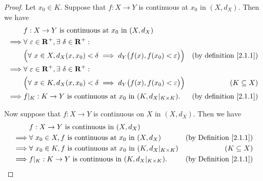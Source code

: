 \begin{proof}
    Let \(x_0 \in K\).
    Suppose that \(f : X \to Y\) is continuous at \(x_0\) in \((X, d_X)\).
    Then we have
    \begin{align*}
                 & f : X \to Y \text{ is continuous at } x_0 \text{ in } (X, d_X)                                                                         \\
        \implies & \forall\ \varepsilon \in \mathbf{R}^+, \exists\ \delta \in \mathbf{R}^+ :                                                              \\
                 & \Big(\forall\ x \in X, d_X(x, x_0) < \delta \implies d_Y\big(f(x), f(x_0) < \varepsilon\big)\Big) & \text{(by definition \ref{2.1.1})} \\
        \implies & \forall\ \varepsilon \in \mathbf{R}^+, \exists\ \delta \in \mathbf{R}^+ :                                                              \\
                 & \Big(\forall\ x \in K, d_X(x, x_0) < \delta \implies d_Y\big(f(x), f(x_0) < \varepsilon\big)\Big) & (K \subseteq X)                    \\
        \implies & f|_K : K \to Y \text{ is continuous at } x_0 \text{ in } (K, d_X|_{K \times K}).                  & \text{(by definition \ref{2.1.1})}
    \end{align*}

    Now suppose that \(f : X \to Y\) is continuous on \(X\) in \((X, d_X)\).
    Then we have
    \begin{align*}
                 & f : X \to Y \text{ is continuous in } (X, d_X)                                                                              \\
        \implies & \forall\ x_0 \in X, f \text{ is continuous at } x_0 \text{ in } (X, d_X)               & \text{(by Definition \ref{2.1.1})} \\
        \implies & \forall\ x_0 \in K, f \text{ is continuous at } x_0 \text{ in } (K, d_X|_{K \times K}) & (K \subseteq X)                    \\
        \implies & f|_K : K \to Y \text{ is continuous in } (K, d_X|_{K \times K}).                       & \text{(by Definition \ref{2.1.1})}
    \end{align*}
\end{proof}


